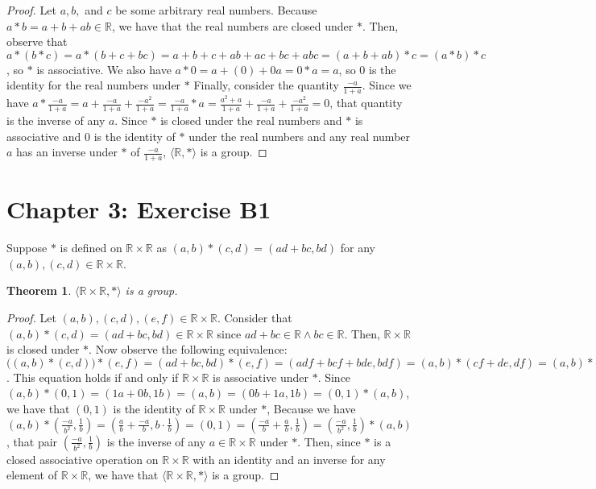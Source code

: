\documentclass[12pt]{article}
\newcommand{\reals}{\mathbb{R}}
\newtheorem{thm}{Theorem}
\begin{document}
\begin{proof}
	Let $a,b,$ and $c$ be some arbitrary real numbers.
	Because $a * b = a + b + ab \in \reals$, we have that the real numbers are closed under $*$.
	Then, observe that $a * (b * c)  = a * (b + c + bc) = a + b + c + ab + ac + bc + abc = (a + b + ab) * c = (a * b) * c$, so $*$ is associative.
	We also have $a * 0 = a + (0) + 0a = 0 * a = a$, so $0$ is the identity for the real numbers under $*$
	Finally, consider the quantity $\frac{-a}{1+a}$.
	Since we have $a * \frac{-a}{1+a} = a + \frac{-a}{1+a} +  \frac{-a^2}{1+a} = \frac{-a}{1 + a} * a = \frac{a^2+a}{1+a} + \frac{-a}{1+a} + \frac{-a^2}{1+a} = 0$, that quantity is the inverse of any $a$.
	Since $*$ is closed under the real numbers and $*$ is associative and $0$ is the identity of $*$ under the real numbers and any real number $a$ has an inverse under $*$ of $\frac{-a}{1+a}$, $\langle \reals, * \rangle$ is a group.
\end{proof}

\section{Chapter 3: Exercise B1}

Suppose $*$ is defined on $\reals \times \reals$ as $(a,b) * (c,d) = (ad+bc,bd)$ for any $(a,b),(c,d) \in \reals \times \reals$.

\begin{thm}
	$\langle \reals \times \reals, * \rangle$ is a group.
\end{thm}

\begin{proof}
	Let $(a,b),(c,d),(e,f) \in \reals \times \reals$.
	Consider that $(a,b) * (c,d) = (ad+bc,bd) \in \reals \times \reals$ since $ad+bc \in \reals \land bc \in \reals$.
	Then, $\reals \times \reals$ is closed under $*$.
	Now observe the following equivalence: $\Big((a,b) * (c,d)\Big) * (e,f) = (ad+bc,bd) * (e,f) = (adf+bcf+bde,bdf) = (a,b) * (cf+de,df) = (a,b) * \Big((c,d) * (e,f)\Big)$.
	This equation holds if and only if $\reals \times \reals$ is associative under $*$.
	Since $(a,b) * (0,1) = (1a+0b,1b) = (a,b) = (0b + 1a,1b) = (0,1) * (a,b)$, we have that $(0,1)$ is the identity of $\reals \times \reals$ under $*$,
	Because we have $(a,b)*(\frac{-a}{b^2},\frac{1}{b})=(\frac{a}{b}+\frac{-a}{b}, b \cdot \frac{1}{b}) = (0,1) = (\frac{-a}{b}+\frac{a}{b},\frac{1}{b}) = (\frac{-a}{b^2},\frac{1}{b}) * (a,b)$, that pair $(\frac{-a}{b^2},\frac{1}{b})$ is the inverse of any $a \in \reals \times \reals$ under $*$.
	Then, since $*$ is a closed associative operation on $\reals \times \reals$ with an identity and an inverse for any element of $\reals \times \reals$, we have that $\langle \reals \times \reals, * \rangle$ is a group.
	
\end{proof}
\end{document}
